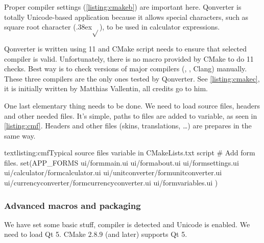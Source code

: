 Proper compiler settings (\autoref{listing:cmakeb}) are important here. Qonverter is totally Unicode-based application because it allows special characters, such as square root character ({\raise.38ex\hbox{$\sqrt{ }$}}), to be used in calculator expressions.


Qonverter is written using \cpp{} 11 and CMake script needs to ensure that selected compiler is valid. Unfortunately, there is no macro provided by CMake to do \cpp{} 11 checks. Best way is to check versions of major compilers (, , Clang) manually. These three compilers are the only ones tested by Qonverter. See \autoref{listing:cmakec}, it is initially written by Matthias Vallentin, all credits go to him.

One last elementary thing needs to be done. We need to load source files, headers and other needed files. It's simple, paths to files are added to variable, as seen in \autoref{listing:cmf}. Headers and other files (skins, translations, \ldots) are prepares in the same way.

\begin{fdoccode}{text}{listing:cmf}{Typical source files variable in CMakeLists.txt script}
# Add form files.
set(APP_FORMS
    ui/formmain.ui
    ui/formabout.ui
    ui/formsettings.ui
    ui/calculator/formcalculator.ui
    ui/unitconverter/formunitconverter.ui
    ui/currencyconverter/formcurrencyconverter.ui
    ui/formvariables.ui
)
\end{fdoccode}

\subsubsection{Advanced macros and packaging}
We have set some basic stuff, compiler is detected and Unicode is enabled. We need to load Qt 5. CMake $2.8.9$ (and later) supports Qt 5.

